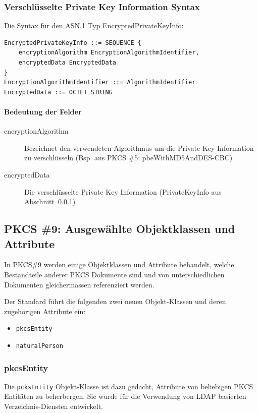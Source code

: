 \documentclass[10pt,a4paper]{article}
\begin{document}
\subsubsection{Verschlüsselte Private Key Information Syntax}
\label{sec:private-key-info}
Die Syntax für den ASN.1 Typ EncryptedPrivateKeyInfo:
\begin{verbatim}
EncryptedPrivateKeyInfo ::= SEQUENCE {
    encryptionAlgorithm EncryptionAlgorithmIdentifier,
    encryptedData EncryptedData
}
EncryptionAlgorithmIdentifier ::= AlgorithmIdentifier
EncryptedData ::= OCTET STRING
\end{verbatim}

\paragraph{Bedeutung der Felder}
\begin{description}
    \item[encryptionAlgorithm] Bezeichnet den verwendeten Algorithmus um die Private Key
        Information zu verschlüsseln (Bsp. aus PKCS \#5: pbeWithMD5AndDES-CBC)
    \item[encryptedData] Die verschlüsselte Private Key Information (PrivateKeyInfo aus
        Abschnitt~\ref{sec:private-key-info})
\end{description}

\subsection{PKCS \#9: Ausgewählte Objektklassen und Attribute}
In PKCS\#9 werden einige Objektklassen und Attribute behandelt, welche Bestandteile
anderer PKCS Dokumente sind und von unterschiedlichen Dokumenten gleichermassen
referenziert werden.

Der Standard führt die folgenden zwei neuen Objekt-Klassen und deren zugehörigen Attribute
ein:
\begin{itemize}
    \item \texttt{pkcsEntity}
    \item \texttt{naturalPerson}
\end{itemize}

\subsubsection{pkcsEntity}
Die \texttt{pcksEntity} Objekt-Klasse ist dazu gedacht, Attribute von beliebigen PKCS
Entitäten zu beherbergen. Sie wurde für die Verwendung von LDAP basierten
Verzeichnis-Diensten entwickelt.
\end{document}

